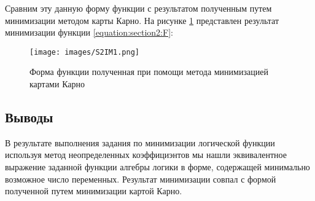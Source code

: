 Сравним эту данную форму функции с результатом полученным путем минимизации методом карты Карно. На рисунке \ref{fig:section2:karno} представлен результат минимизации функции \ref{equation:section2:F}:

\begin{figure}[ht!]
    \centering
    \texttt{[image: images/S2IM1.png]}
    \caption{Форма функции полученная при помощи метода минимизацией картами Карно}
    \label{fig:section2:karno}
\end{figure}
\vspace{-1.5em}
\subsection{Выводы}
В результате выполнения задания по минимизации логической функции
используя метод неопределенных коэффициэнтов мы нашли эквивалентное выражение
заданной функции алгебры логики в форме, содержащей минимально
возможное число переменных. Результат минимизации совпал с формой полученной путем минимизации картой Карно.
